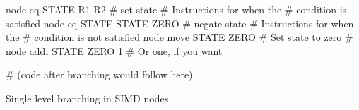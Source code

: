 \begin{listing}[h]
  \centering
  \begin{lenacode}
    node eq STATE R1 R2      # set state 
      # Instructions for when the
      # condition is satisfied
    node eq STATE STATE ZERO # negate state
      # Instructions for when the
      # condition is not satisfied
    node move STATE ZERO     # Set state to zero
    # node addi STATE ZERO 1 # Or one, if you want

    # (code after branching would follow here)
  \end{lenacode}
  \caption[Single level branching]{Single level branching in SIMD nodes}
  \label{lst:single-level-branching}
\end{listing}

